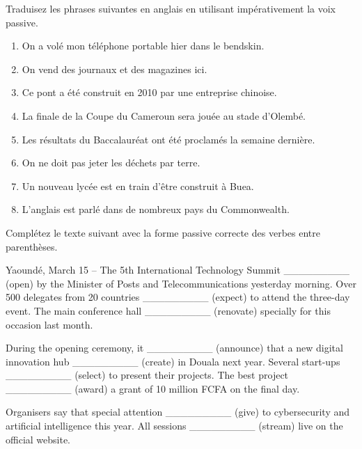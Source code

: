 \documentclass[11pt]{article}
\begin{document}
\begin{exercice}
Traduisez les phrases suivantes en anglais en utilisant impérativement la voix passive.
\begin{enumerate}
    \item On a volé mon téléphone portable hier dans le bendskin.
    \item On vend des journaux et des magazines ici.
    \item Ce pont a été construit en 2010 par une entreprise chinoise.
    \item La finale de la Coupe du Cameroun sera jouée au stade d'Olembé.
    \item Les résultats du Baccalauréat ont été proclamés la semaine dernière.
    \item On ne doit pas jeter les déchets par terre.
    \item Un nouveau lycée est en train d'être construit à Buea.
    \item L'anglais est parlé dans de nombreux pays du Commonwealth.
\end{enumerate}
\end{exercice}

\begin{exercice}
Complétez le texte suivant avec la forme passive correcte des verbes entre parenthèses.
\begin{textebox}
Yaoundé, March 15 -- The 5th International Technology Summit \_\_\_\_\_\_\_\_\_ (open) by the Minister of Posts and Telecommunications yesterday morning. Over 500 delegates from 20 countries \_\_\_\_\_\_\_\_\_ (expect) to attend the three-day event. The main conference hall \_\_\_\_\_\_\_\_\_ (renovate) specially for this occasion last month.

During the opening ceremony, it \_\_\_\_\_\_\_\_\_ (announce) that a new digital innovation hub \_\_\_\_\_\_\_\_\_ (create) in Douala next year. Several start-ups \_\_\_\_\_\_\_\_\_ (select) to present their projects. The best project \_\_\_\_\_\_\_\_\_ (award) a grant of 10 million FCFA on the final day.

Organisers say that special attention \_\_\_\_\_\_\_\_\_ (give) to cybersecurity and artificial intelligence this year. All sessions \_\_\_\_\_\_\_\_\_ (stream) live on the official website.
\end{textebox}
\end{exercice}
\end{document}
